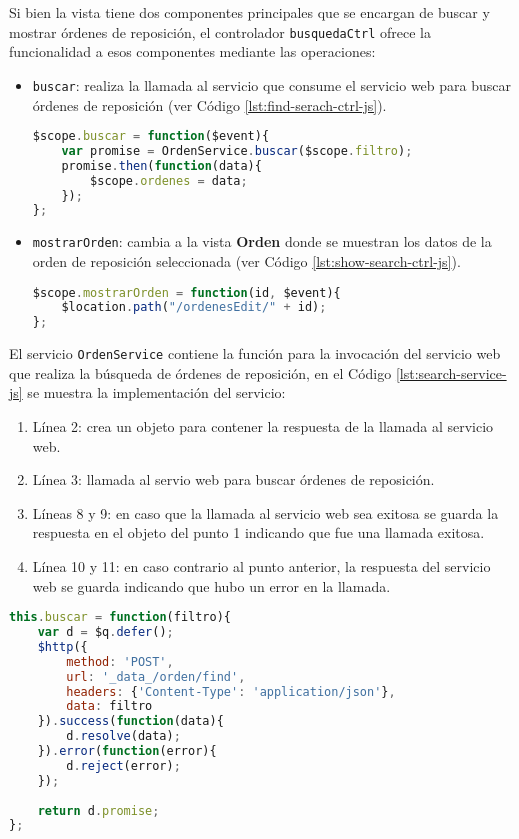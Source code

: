 Si bien la vista tiene dos componentes principales que se encargan de buscar y mostrar órdenes de reposición, el controlador \texttt{busquedaCtrl} ofrece la funcionalidad a esos componentes mediante las operaciones:
\begin{itemize}
	\item \texttt{buscar}: realiza la llamada al servicio que consume el servicio web para buscar órdenes de reposición (ver Código \ref{lst:find-serach-ctrl-js}).
\begin{lstlisting}[language=Javascript, caption={Función para llamar el servicio de búsqueda de órdenes de reposición.}, captionpos=b, label={lst:find-serach-ctrl-js}]
$scope.buscar = function($event){
	var promise = OrdenService.buscar($scope.filtro);
	promise.then(function(data){
		$scope.ordenes = data;
	});
};
\end{lstlisting}

	\item \texttt{mostrarOrden}: cambia a la vista \textbf{Orden} donde se muestran los datos de la orden de reposición seleccionada (ver Código \ref{lst:show-search-ctrl-js}).
\begin{lstlisting}[language=Javascript, caption={Función para mostrar la vista de una orden de reposición.}, captionpos=b, label={lst:show-search-ctrl-js}]
$scope.mostrarOrden = function(id, $event){
	$location.path("/ordenesEdit/" + id);
};
\end{lstlisting}
\end{itemize}

El servicio \texttt{OrdenService} contiene la función para la invocación del servicio web que realiza la búsqueda de órdenes de reposición, en el Código \ref{lst:search-service-js} se muestra la implementación del servicio:
\begin{enumerate}
	\item Línea 2: crea un objeto para contener la respuesta de la llamada al servicio web.
	\item Línea 3: llamada al servio web para buscar órdenes de reposición.
	\item Líneas 8 y 9: en caso que la llamada al servicio web sea exitosa se guarda la respuesta en el objeto del punto 1 indicando que fue una llamada exitosa.
	\item Línea 10 y 11: en caso contrario al punto anterior, la respuesta del servicio web se guarda indicando que hubo un error en la llamada.
\end{enumerate}

\begin{lstlisting}[language=Javascript, caption={Servicio de \textit{AngularJS} para buscar órdenes de reposición.}, captionpos=b, label={lst:search-service-js}]
this.buscar = function(filtro){
	var d = $q.defer();
	$http({
		method: 'POST',
		url: '_data_/orden/find',
		headers: {'Content-Type': 'application/json'},
		data: filtro
	}).success(function(data){
		d.resolve(data);
	}).error(function(error){
		d.reject(error);
	});
	
	return d.promise;
};
\end{lstlisting}

